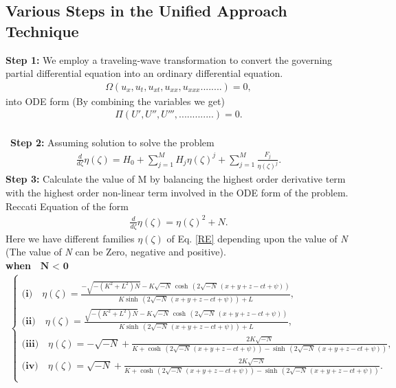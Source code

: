 \documentclass{article}
\numberwithin{equation}{section}
\begin{document}
\subsection{Various Steps in the Unified Approach Technique}
\textbf{Step 1:}
We employ a traveling-wave transformation to convert the governing partial differential equation into an ordinary differential equation.
\begin{eqnarray}\label{PDE}
\Omega(u_x,u_t,u_{xt},u_{xx},u_{xxx}........)=0,
\end{eqnarray}
into ODE form (By combining the variables we get)
\begin{eqnarray}\label{ODE}
\Pi(U',U'',U''',.............)=0.
\end{eqnarray}\\\
\textbf{Step 2:}
Assuming solution to solve the problem
\begin{eqnarray}\label{TF}
\frac{d}{d \zeta}\eta \! \left(\zeta \right) =H_{0}+ \sum_{j=1}^M H_{j}\eta \left(\zeta \right)^{j}+\sum_{j=1}^M \frac{F_{j}}{\eta \left(\zeta \right)^{j}}.
\end{eqnarray}
\textbf{Step 3:}
Calculate the value of M by balancing the highest order derivative term with the highest order non-linear term involved in the ODE form of the problem.\\
Reccati Equation of the form
\begin{eqnarray}\label{RE}
\frac{d}{d \zeta}\eta \! \left(\zeta \right) =\eta \! \left(\zeta \right)^{2}+N.
\end{eqnarray}
Here we have different families ${\eta(\zeta)}$ of Eq. \ref{RE} depending upon the value of \emph{N} (The value of \emph{N} can be Zero, negative and positive).\\
\textbf{when $\textbf{ N $<$ 0} $ }
\begin{align}\label{FAM1}
\begin{cases}\\
\textbf{(i)}\quad \eta \! \left(\zeta \right) =\frac{-\sqrt{-\left(K^{2}+L^{2}\right) N}-K \sqrt{-N}\, \cosh \, \left(2 \sqrt{-N}\, \left(x+y+z-ct +\psi \right)\right)}{K \sinh \, \left(2 \sqrt{-N}\, \left(x+y+z-ct +\psi \right)\right)+L},\\
\textbf{(ii)}\quad \eta \! \left(\zeta \right) =\frac{\sqrt{-\left(K^{2}+L^{2}\right) N}-K \sqrt{-N}\, \cosh \, \left(2 \sqrt{-N}\, \left(x+y+z-ct +\psi \right)\right)}{K \sinh \, \left(2 \sqrt{-N}\, \left(x+y+z-ct +\psi \right)\right)+L},\\
\textbf{(iii)}\quad \eta \! \left(\zeta \right) =-\sqrt{-N}+\frac{2 K \sqrt{-N}}{K +\cosh \, \left(2 \sqrt{-N}\, \left(x+y+z-ct +\psi \right)\right)-\sinh \, \left(2 \sqrt{-N}\, \left(x+y+z-ct +\psi \right)\right)},\\
\textbf{(iv)}\quad \eta \! \left(\zeta \right) =\sqrt{-N}+\frac{2 K \sqrt{-N}}{K +\cosh \, \left(2 \sqrt{-N}\, \left(x+y+z-ct +\psi \right)\right)-\sinh \, \left(2 \sqrt{-N}\, \left(x+y+z-ct +\psi \right)\right)}.\\
\end{cases}
\end{align}
\end{document}
